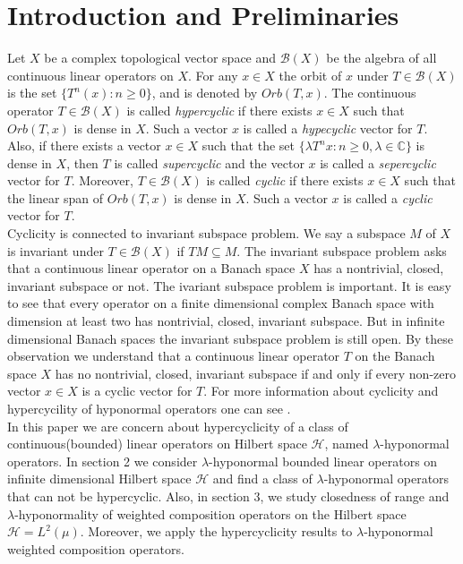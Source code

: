 \documentclass{amsart}
\theoremstyle{definition}\newtheorem{defn}[thm]{Definition}
\theoremstyle{remark}
\numberwithin{equation}{section}
\begin{document}
\section{ \sc\bf Introduction and Preliminaries}
Let $X$ be a complex topological vector space and $\mathcal{B}(X)$ be the algebra of all continuous linear operators on $X$.
For any $x\in X$ the orbit of $x$ under $T\in \mathcal{B}(X)$ is the set $\{T^n(x):n\geq 0\}$, and is denoted by $Orb(T,x)$.
The continuous operator $T\in \mathcal{B}(X)$ is called {\it hypercyclic} if there exists $x\in X$ such that $Orb(T,x)$ is dense in $X$. Such a vector $x$ is called a {\it hypecyclic} vector for $T$. Also, if there exists a vector $x\in X$ such that the set $\{\lambda T^nx:n\geq 0, \lambda\in \mathbb{C}\}$ is dense in $X$, then $T$ is called {\it supercyclic} and the vector $x$ is called a {\it sepercyclic} vector for $T$. Moreover, $T\in \mathcal{B}(X)$ is called {\it cyclic} if there exists $x\in X$ such that the linear span of $Orb(T,x)$ is dense in $X$. Such a vector $x$ is called a {\it cyclic} vector for $T$.\\
Cyclicity is connected to invariant subspace problem. We say a subspace $M$ of $X$ is invariant under $T\in \mathcal{B}(X)$ if $TM\subseteq M$. The invariant subspace problem asks that a continuous linear operator on a Banach space $X$ has a nontrivial, closed, invariant subspace or not. The ivariant subspace problem is important. It is easy to see that every operator on a finite dimensional complex Banach space with dimension at least two has nontrivial, closed, invariant subspace. But in infinite dimensional Banach spaces the invariant subspace problem is still open. By these observation we understand that a continuous linear operator $T$ on the Banach space $X$ has no nontrivial, closed, invariant subspace if and only if every non-zero vector $x\in X$ is a cyclic vector for $T$. For more information about cyclicity and hypercycility of hyponormal operators one can see \cite{bm, cr, sand}. \\

In this paper we are concern about hypercyclicity of a class of continuous(bounded) linear operators on Hilbert space $\mathcal{H}$, named $\lambda$-hyponormal operators. In section 2 we consider $\lambda$-hyponormal bounded linear operators on infinite dimensional Hilbert space $\mathcal{H}$ and find a class of $\lambda$-hyponormal operators that can not be hypercyclic.  Also, in section 3, we study closedness of range and $\lambda$-hyponormality of weighted composition operators on the Hilbert space $\mathcal{H}=L^2(\mu)$. Moreover, we apply the hypercyclicity results to $\lambda$-hyponormal weighted composition operators.
\end{document}
